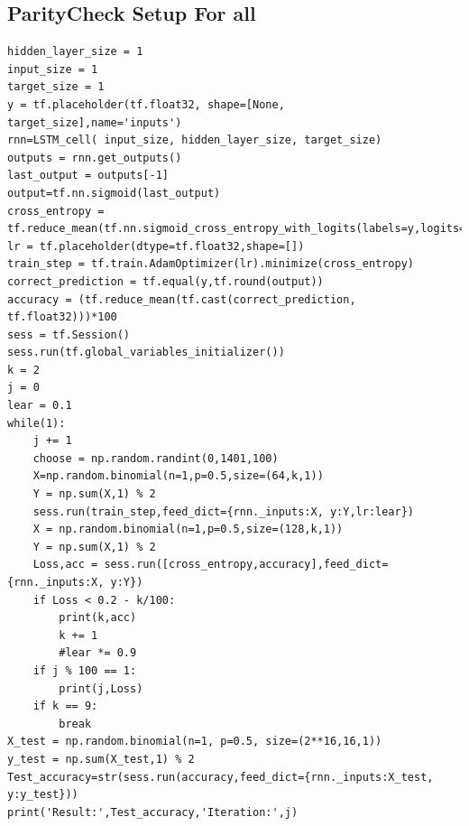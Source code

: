 \documentclass[12pt, letterpaper]{article}
\begin{document}
\subsection{ParityCheck Setup For all}
\begin{verbatim}
hidden_layer_size = 1
input_size = 1
target_size = 1
y = tf.placeholder(tf.float32, shape=[None, target_size],name='inputs')
rnn=LSTM_cell( input_size, hidden_layer_size, target_size)
outputs = rnn.get_outputs()
last_output = outputs[-1]
output=tf.nn.sigmoid(last_output)
cross_entropy = tf.reduce_mean(tf.nn.sigmoid_cross_entropy_with_logits(labels=y,logits=last_output))
lr = tf.placeholder(dtype=tf.float32,shape=[])
train_step = tf.train.AdamOptimizer(lr).minimize(cross_entropy)
correct_prediction = tf.equal(y,tf.round(output))
accuracy = (tf.reduce_mean(tf.cast(correct_prediction, tf.float32)))*100
sess = tf.Session()
sess.run(tf.global_variables_initializer())
k = 2
j = 0
lear = 0.1
while(1):
    j += 1
    choose = np.random.randint(0,1401,100)
    X=np.random.binomial(n=1,p=0.5,size=(64,k,1))
    Y = np.sum(X,1) % 2
    sess.run(train_step,feed_dict={rnn._inputs:X, y:Y,lr:lear})
    X = np.random.binomial(n=1,p=0.5,size=(128,k,1))
    Y = np.sum(X,1) % 2
    Loss,acc = sess.run([cross_entropy,accuracy],feed_dict={rnn._inputs:X, y:Y})
    if Loss < 0.2 - k/100:
        print(k,acc)
        k += 1
        #lear *= 0.9
    if j % 100 == 1:
        print(j,Loss)
    if k == 9:
        break
X_test = np.random.binomial(n=1, p=0.5, size=(2**16,16,1))
y_test = np.sum(X_test,1) % 2
Test_accuracy=str(sess.run(accuracy,feed_dict={rnn._inputs:X_test, y:y_test}))
print('Result:',Test_accuracy,'Iteration:',j)
\end{verbatim}
\end{document}
